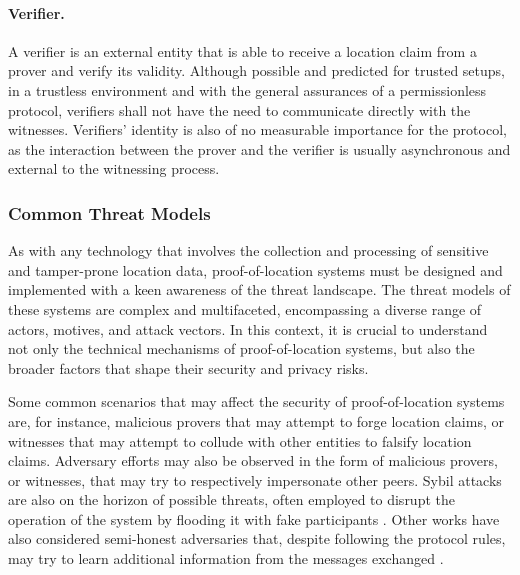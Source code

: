 \paragraph{Verifier.} A verifier is an external entity that is able to receive a location claim from a prover and verify its validity. Although possible and predicted for trusted setups, in a trustless environment and with the general assurances of a permissionless protocol, verifiers shall not have the need to communicate directly with the witnesses. Verifiers' identity is also of no measurable importance for the protocol, as the interaction between the prover and the verifier is usually asynchronous and external to the witnessing process.

\subsubsection{Common Threat Models}

As with any technology that involves the collection and processing of sensitive and tamper-prone location data, proof-of-location systems must be designed and implemented with a keen awareness of the threat landscape. The threat models of these systems are complex and multifaceted, encompassing a diverse range of actors, motives, and attack vectors. In this context, it is crucial to understand not only the technical mechanisms of proof-of-location systems, but also the broader factors that shape their security and privacy risks. 

Some common scenarios that may affect the security of proof-of-location systems are, for instance, malicious provers that may attempt to forge location claims, or witnesses that may attempt to collude with other entities to falsify location claims. Adversary efforts may also be observed in the form of malicious provers, or witnesses, that may try to respectively impersonate other peers. Sybil attacks are also on the horizon of possible threats, often employed to disrupt the operation of the system by flooding it with fake participants \cite{nasrulin2018robust}. Other works have also considered semi-honest adversaries that, despite following the protocol rules, may try to learn additional information from the messages exchanged \cite{dupin2018location}.